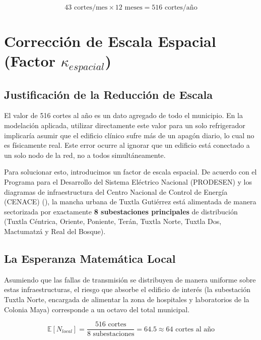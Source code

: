 \documentclass[
  spanish,
  letterpaper,
  DIV=11,
  numbers=noendperiod]{scrreprt}
\theoremstyle{plain}
\theoremstyle{definition}
\theoremstyle{remark}
\begin{document}
\[43 \text{ cortes/mes} \times 12 \text{ meses} = 516 \text{ cortes/año}\]

\section{\texorpdfstring{Corrección de Escala Espacial (Factor
\(\kappa_{espacial}\))}{Corrección de Escala Espacial (Factor \textbackslash kappa\_\{espacial\})}}\label{correcciuxf3n-de-escala-espacial-factor-kappa_espacial}

\subsection{Justificación de la Reducción de
Escala}\label{justificaciuxf3n-de-la-reducciuxf3n-de-escala}

El valor de 516 cortes al año es un dato agregado de todo el municipio.
En la modelación aplicada, utilizar directamente este valor para un solo
refrigerador implicaría asumir que el edificio clínico sufre más de un
apagón diario, lo cual no es físicamente real. Este error ocurre al
ignorar que un edificio está conectado a un solo nodo de la red, no a
todos simultáneamente.

Para solucionar esto, introducimos un factor de escala espacial. De
acuerdo con el Programa para el Desarrollo del Sistema Eléctrico
Nacional (PRODESEN) y los diagramas de infraestructura del Centro
Nacional de Control de Energía (CENACE)
(), la
mancha urbana de Tuxtla Gutiérrez está alimentada de manera sectorizada
por exactamente \textbf{8 subestaciones principales} de distribución
(Tuxtla Céntrica, Oriente, Poniente, Terán, Tuxtla Norte, Tuxtla Dos,
Mactumatzá y Real del Bosque).

\subsection{La Esperanza Matemática
Local}\label{la-esperanza-matemuxe1tica-local}

Asumiendo que las fallas de transmisión se distribuyen de manera
uniforme sobre estas infraestructuras, el riesgo que absorbe el edificio
de interés (la subestación Tuxtla Norte, encargada de alimentar la zona
de hospitales y laboratorios de la Colonia Maya) corresponde a un octavo
del total municipal.

\[\mathbb{E}[N_{local}] = \frac{516 \text{ cortes}}{8 \text{ subestaciones}} = 64.5 \approx 64 \text{ cortes al año}\]
\end{document}
